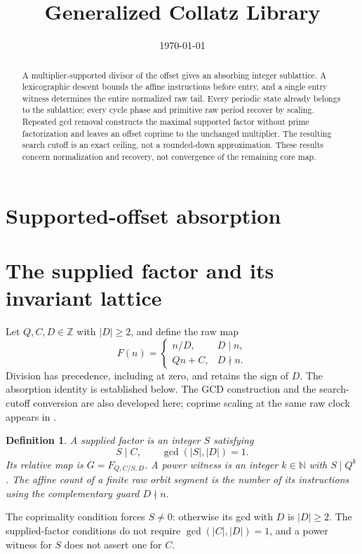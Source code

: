 \documentclass[11pt,letterpaper]{article}
\title{Generalized Collatz Library}
\author{}
\date{\today}
\newcommand{\N}{\mathbb{N}}
\newcommand{\Z}{\mathbb{Z}}
\newtheorem{definition}[theorem]{Definition}
\begin{document}
\maketitle
\section*{Supported-offset absorption}

\begin{abstract}
A multiplier-supported divisor of the offset gives an absorbing integer
sublattice. A lexicographic descent bounds the affine instructions before
entry, and a single entry witness determines the entire normalized raw tail.
Every periodic state already belongs to the sublattice; every cycle phase
and primitive raw period recover by scaling. Repeated gcd removal constructs
the maximal supported factor without prime factorization and leaves an
offset coprime to the unchanged multiplier. The resulting search cutoff is
an exact ceiling, not a rounded-down approximation. These results concern
normalization and recovery, not convergence of the remaining core map.
\end{abstract}

\section{The supplied factor and its invariant lattice}

Let \(Q,C,D\in\Z\) with \(|D|\ge2\), and define the raw map
\[
F(n)=\begin{cases}
n/D,&D\mid n,\\
Qn+C,&D\nmid n.
\end{cases}
\]
Division has precedence, including at zero, and retains the sign of \(D\).
The absorption identity is established below. The GCD construction and the
search-cutoff conversion are also developed here; coprime scaling at the
same raw clock appears in \cite{AscendScaling}.

\begin{definition}
A supplied factor is an integer \(S\) satisfying
\[
S\mid C,\qquad \gcd(|S|,|D|)=1.
\]
Its relative map is \(G=F_{Q,C/S,D}\). A power witness is an integer
\(k\in\N\) with \(S\mid Q^k\). The affine count of a finite raw orbit
segment is the number of its instructions using the complementary guard
\(D\nmid n\).
\end{definition}

The coprimality condition forces \(S\ne0\): otherwise its gcd with \(D\)
is \(|D|\ge2\). The supplied-factor conditions do not require
\(\gcd(|C|,|D|)=1\), and a power witness for \(S\) does not assert one for
\(C\).
\end{document}
